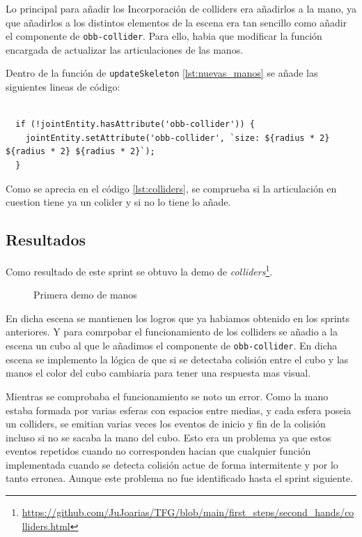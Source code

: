 \documentclass[a4paper, 12pt]{book}
\begin{document}
Lo principal para añadir los Incorporación de colliders  
era añadirlos a la mano, ya que añadirlos a los distintos elementos de la escena era tan sencillo como añadir el componente de \texttt{obb-collider}. Para ello,
habia que modificar la función encargada de actualizar las articulaciones de las manos. 

Dentro de la función de \texttt{updateSkeleton} \ref{lst:nuevas_manos} se añade las siguientes lineas de código:

\begin{lstlisting}[caption=Añadir Incorporación de colliders a la mano, captionpos=b, label=lst:colliders]
  
  if (!jointEntity.hasAttribute('obb-collider')) {
    jointEntity.setAttribute('obb-collider', `size: ${radius * 2} ${radius * 2} ${radius * 2}`);
  }
\end{lstlisting}

Como se aprecia en el código \ref{lst:colliders}, se comprueba si la articulación en cuestion tiene ya un colider y si no lo tiene lo añade.

\subsection{Resultados}
\label{subsec:resultados4}
Como resultado de este sprint se obtuvo la demo de \textit{colliders}\footnote{\url{https://github.com/JuJoarias/TFG/blob/main/first_steps/second_hands/colliders.html}}. 

\begin{figure}[H] 
  \centering
  \fbox{\rule{0pt}{150pt} \rule{0.7\textwidth}{0pt}} 
  \caption{Primera demo de manos}
  \label{fig:sprint4}
\end{figure}

En dicha escena se mantienen los logros que ya habiamos obtenido en los sprints anteriores. Y para comrpobar el funcionamiento de los colliders se añadio a la escena un cubo
al que le añadimos el componente de \texttt{obb-collider}. En dicha escena se implemento la lógica de que si se detectaba colisión entre el cubo y las manos  el color del cubo cambiaria para tener una respuesta mas visual. 

Mientras se comprobaba el funcionamiento se noto un error. Como la mano estaba formada por varias esferas con espacios entre medias, y cada  esfera poseia un colliders, se emitian varias veces los eventos de inicio y fin de la colisión incluso si no se sacaba la mano del cubo. 
Esto era un problema ya que estos eventos repetidos cuando no corresponden hacian que cualquier función implementada cuando se detecta colisión actue de forma intermitente y por lo tanto erronea. Aunque este problema no fue identificado hasta el sprint siguiente. 
\end{document}
